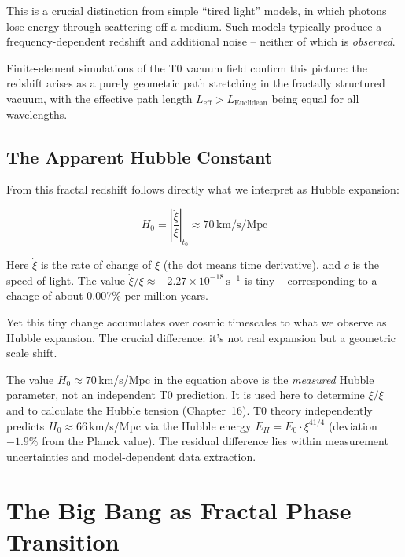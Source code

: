 This is a crucial distinction from simple ``tired light'' models, in which photons lose energy through scattering off a medium. Such models typically produce a frequency-dependent redshift and additional noise -- neither of which is \textit{observed}.

Finite-element simulations of the T0 vacuum field confirm this picture: the redshift arises as a purely geometric path stretching in the fractally structured vacuum, with the effective path length $L_{\text{eff}} > L_{\text{Euclidean}}$ being equal for all wavelengths.

\subsection{The Apparent Hubble Constant}

From this fractal redshift follows directly what we interpret as Hubble expansion:

\begin{equation}
H_0 = \left|\frac{\dot{\xi}}{\xi}\right|_{t_0} \approx 70 \, \text{km/s/Mpc}
\end{equation}

Here $\dot{\xi}$ is the rate of change of $\xi$ (the dot means time derivative), and $c$ is the speed of light. The value $\dot{\xi}/\xi \approx -2.27 \times 10^{-18} \, \text{s}^{-1}$ is tiny -- corresponding to a change of about 0.007\% per million years.

Yet this tiny change accumulates over cosmic timescales to what we observe as Hubble expansion. The crucial difference: it's not real expansion but a geometric scale shift.

\begin{remark}
The value $H_0 \approx 70\,$km/s/Mpc in the equation above is the \emph{measured} Hubble parameter, not an independent T0 prediction. It is used here to determine $\dot{\xi}/\xi$ and to calculate the Hubble tension (Chapter~16). T0 theory independently predicts $H_0 \approx 66\,$km/s/Mpc via the Hubble energy $E_H = E_0 \cdot \xi^{41/4}$ (deviation $-1.9\%$ from the Planck value). The residual difference lies within measurement uncertainties and model-dependent data extraction.
\end{remark}

\section{The Big Bang as Fractal Phase Transition}

